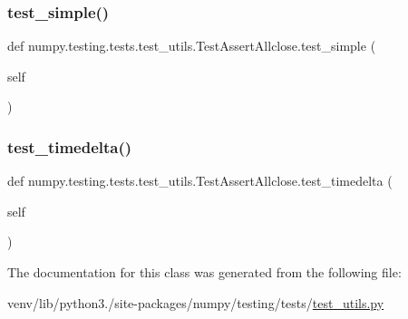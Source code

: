 \subsubsection{\texorpdfstring{test\+\_\+simple()}{test\_simple()}}
{\footnotesize\ttfamily def numpy.\+testing.\+tests.\+test\+\_\+utils.\+Test\+Assert\+Allclose.\+test\+\_\+simple (\begin{DoxyParamCaption}\item[{}]{self }\end{DoxyParamCaption})}

\mbox{\label{classnumpy_1_1testing_1_1tests_1_1test__utils_1_1TestAssertAllclose_ae4839d51bb2047be3fb20b15dc945c84}} 
\subsubsection{\texorpdfstring{test\+\_\+timedelta()}{test\_timedelta()}}
{\footnotesize\ttfamily def numpy.\+testing.\+tests.\+test\+\_\+utils.\+Test\+Assert\+Allclose.\+test\+\_\+timedelta (\begin{DoxyParamCaption}\item[{}]{self }\end{DoxyParamCaption})}



The documentation for this class was generated from the following file\+:\begin{DoxyCompactItemize}
\item 
venv/lib/python3./site-\/packages/numpy/testing/tests/\hyperlink{numpy_2testing_2tests_2test__utils_8py}{test\+\_\+utils.\+py}\end{DoxyCompactItemize}

